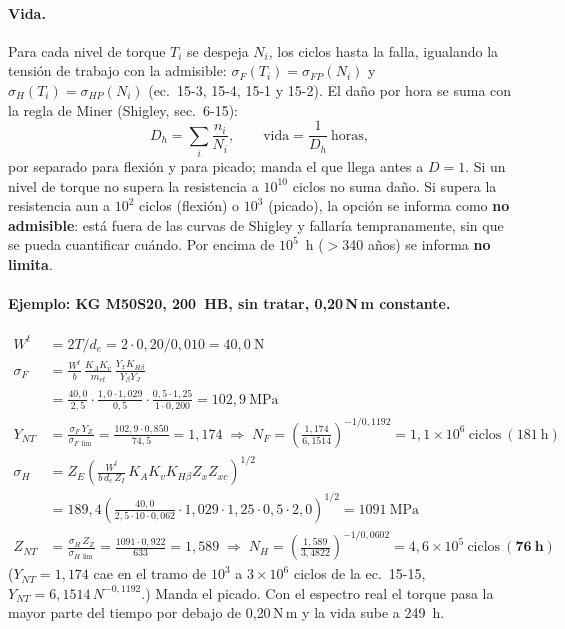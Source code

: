 \documentclass[11pt,a4paper]{article}
\newcommand{\Nm}{\,N\,m\xspace}
\begin{document}
\paragraph{Vida.} Para cada nivel de torque $T_i$ se despeja $N_i$, los ciclos hasta la falla, igualando la tensión de
trabajo con la admisible: $\sigma_F(T_i)=\sigma_{FP}(N_i)$ y $\sigma_H(T_i)=\sigma_{HP}(N_i)$ (ec.~15-3, 15-4, 15-1 y 15-2).
El daño por hora se suma con la regla de Miner (Shigley, sec.~6-15):
\begin{equation}
D_h=\sum_i \frac{n_i}{N_i}, \qquad \text{vida}=\frac{1}{D_h}\ \text{horas},
\end{equation}
por separado para flexión y para picado; manda el que llega antes a $D=1$. Si un nivel de torque no supera la
resistencia a $10^{10}$ ciclos no suma daño. Si supera la resistencia aun a $10^2$ ciclos (flexión) o $10^3$ (picado),
la opción se informa como \textbf{no admisible}: está fuera de las curvas de Shigley y fallaría tempranamente, sin
que se pueda cuantificar cuándo. Por encima de $10^5$~h ($>$340 años) se informa \textbf{no limita}.

\paragraph{Ejemplo: KG M50S20, 200~HB, sin tratar, 0,20\Nm constante.}
\begin{align*}
W^t &= 2T/d_e = 2\cdot0{,}20/0{,}010 = 40{,}0\ \text{N}\\
\sigma_F &= \frac{W^t}{b}\,\frac{K_A K_v}{m_{et}}\,\frac{Y_x K_{H\beta}}{Y_\beta Y_J}\\
  &= \frac{40{,}0}{2{,}5}\cdot\frac{1{,}0\cdot1{,}029}{0{,}5}\cdot\frac{0{,}5\cdot1{,}25}{1\cdot0{,}200} = 102{,}9\ \text{MPa}\\
Y_{NT} &= \frac{\sigma_F\,Y_Z}{\sigma_{F\,\lim}} = \frac{102{,}9\cdot0{,}850}{74{,}5}=1{,}174
  \;\Rightarrow\; N_F=\left(\frac{1{,}174}{6{,}1514}\right)^{-1/0{,}1192}=1{,}1\times10^{6}\ \text{ciclos}\ (181\ \text{h})\\
\sigma_H &= Z_E\left(\frac{W^t}{b\,d_e\,Z_I}\,K_A K_v K_{H\beta} Z_x Z_{xc}\right)^{1/2}\\
  &= 189{,}4\left(\frac{40{,}0}{2{,}5\cdot10\cdot0{,}062}\cdot1{,}029\cdot1{,}25\cdot0{,}5\cdot2{,}0\right)^{1/2} = 1091\ \text{MPa}\\
Z_{NT} &= \frac{\sigma_H\,Z_Z}{\sigma_{H\,\lim}} = \frac{1091\cdot0{,}922}{633}=1{,}589
  \;\Rightarrow\; N_H=\left(\frac{1{,}589}{3{,}4822}\right)^{-1/0{,}0602}=4{,}6\times10^{5}\ \text{ciclos}\ (\mathbf{76\ h})
\end{align*}
($Y_{NT}=1{,}174$ cae en el tramo de $10^3$ a $3\times10^6$ ciclos de la ec.~15-15, $Y_{NT}=6{,}1514\,N^{-0{,}1192}$.) Manda el picado. Con el espectro real el torque pasa la mayor parte del tiempo por debajo de 0,20\Nm y la vida sube a 249~h.
\end{document}
